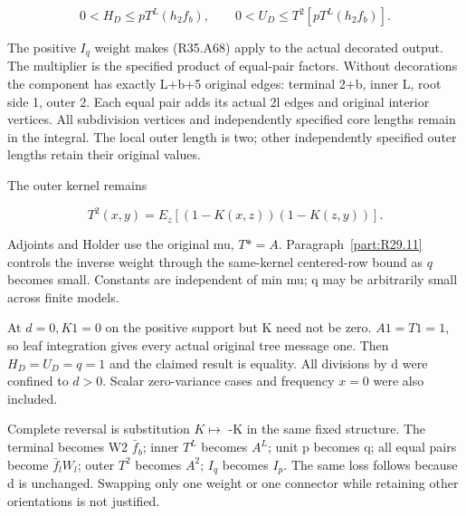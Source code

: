 \[
0<H_D\le pT^L(h_2f_b),\qquad
0<U_D\le T^2[pT^L(h_2f_b)].
\]

The positive \(I_q\) weight makes (R35.A68) apply to the actual decorated output.
The multiplier is the specified product of equal-pair factors.
Without decorations the component has exactly L+b+5 original edges:
terminal 2+b, inner L, root side 1, outer 2.
Each equal pair adds its actual 2l edges and original interior vertices.
All subdivision vertices and independently specified core lengths remain in the integral.
The local outer length is two; other independently specified outer lengths retain their original values.

The outer kernel remains

\[
T^2(x,y)=E_z[(1-K(x,z))(1-K(z,y))].
\]

Adjoints and Holder use the original mu, \(T*=A.\)
Paragraph~\ref{part:R29.11} controls the inverse weight through the
same-kernel centered-row bound as $q$ becomes small.
Constants are independent of min mu; q may be arbitrarily small across finite models.

At \(d=0,\allowbreak  K1=0\) on the positive support but K need not be zero.
\(A1=T1=1,\allowbreak \) so leaf integration gives every actual original tree message one.
Then \(H_D=U_D=q=1\) and the claimed result is equality.
All divisions by d were confined to \(d>0.\)
Scalar zero-variance cases and frequency \(x=0\) were also included.

Complete reversal is substitution \(K\mapsto\) -K in the same fixed structure.
The terminal becomes W2 \(\bar f_b\); inner \(T^L\) becomes \(A^L\); unit p becomes q;
all equal pairs become \(\bar f_l W_l\); outer \(T^2\) becomes \(A^2\); \(I_q\) becomes \(I_p.\)
The same loss follows because d is unchanged.
Swapping only one weight or one connector while retaining other orientations is not justified.
